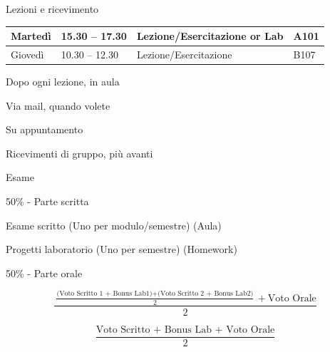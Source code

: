 \begin{frame}{Lezioni e ricevimento}
	
\vspace{-9pt}
\begin{myboxtitle}[Lezioni]
\bigskip
\begin{tabular}{|l|l|l|l|}
\hline
Martedì & 15.30 -- 17.30 & Lezione/Esercitazione \textbf{or} Lab & A101 \\\hline
Giovedì & 10.30 -- 12.30 & Lezione/Esercitazione & B107 \\\hline
\end{tabular}
\end{myboxtitle}

\begin{myboxtitle}[Ricevimento]
\BI
\item Dopo ogni lezione, in aula
\item Via mail, quando volete
\item Su appuntamento	
\item Ricevimenti di gruppo, più avanti
\EI
\end{myboxtitle}
	
\end{frame}

\begin{frame}{Esame}

\vspace{-9pt}
\begin{myboxtitle}
\BIL
\item \alert{50\% - Parte scritta}
\BI
\item Esame scritto (Uno per modulo/semestre) (Aula)
\item Progetti laboratorio (Uno per semestre) (Homework) 
\EI
\item \alert{50\% - Parte orale}
\EIL
\end{myboxtitle}

\begin{myboxtitle}
\[
\frac{\frac{\textrm{(Voto Scritto 1 + Bonus Lab1)} + \textrm{(Voto Scritto 2 + Bonus Lab2)}}{2} + \textrm{Voto Orale}}{2}
\]
\end{myboxtitle}

\begin{myboxtitle}
\[
\frac{\textrm{Voto Scritto + Bonus Lab + Voto Orale}}{2}
\]
\end{myboxtitle}

\end{frame}

